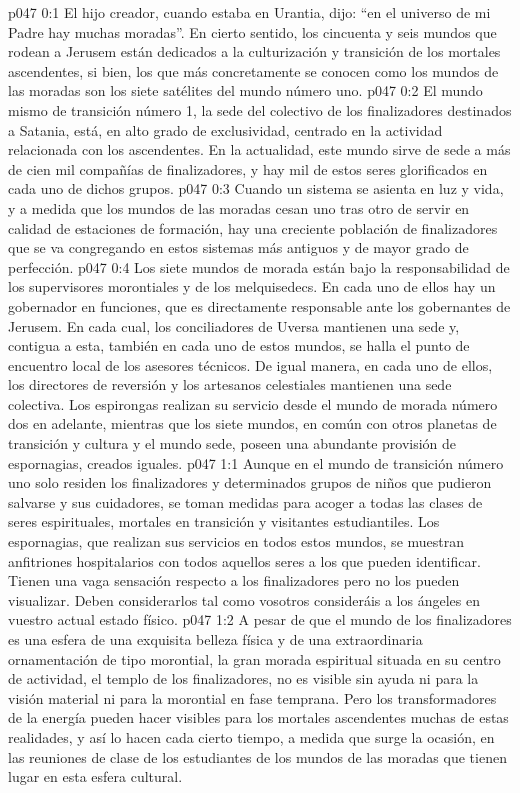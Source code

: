 \author{Brillante estrella vespertina}
\vs p047 0:1 El hijo creador, cuando estaba en Urantia, dijo: “en el universo de mi Padre hay muchas moradas”. En cierto sentido, los cincuenta y seis mundos que rodean a Jerusem están dedicados a la culturización y transición de los mortales ascendentes, si bien, los que más concretamente se conocen como los mundos de las moradas son los siete satélites del mundo número uno.
\vs p047 0:2 El mundo mismo de transición número 1, la sede del colectivo de los finalizadores destinados a Satania, está, en alto grado de exclusividad, centrado en la actividad relacionada con los ascendentes. En la actualidad, este mundo sirve de sede a más de cien mil compañías de finalizadores, y hay mil de estos seres glorificados en cada uno de dichos grupos.
\vs p047 0:3 Cuando un sistema se asienta en luz y vida, y a medida que los mundos de las moradas cesan uno tras otro de servir en calidad de estaciones de formación, hay una creciente población de finalizadores que se va congregando en estos sistemas más antiguos y de mayor grado de perfección.
\vs p047 0:4 Los siete mundos de morada están bajo la responsabilidad de los supervisores morontiales y de los melquisedecs. En cada uno de ellos hay un gobernador en funciones, que es directamente responsable ante los gobernantes de Jerusem. En cada cual, los conciliadores de Uversa mantienen una sede y, contigua a esta, también en cada uno de estos mundos, se halla el punto de encuentro local de los asesores técnicos. De igual manera, en cada uno de ellos, los directores de reversión y los artesanos celestiales mantienen una sede colectiva. Los espirongas realizan su servicio desde el mundo de morada número dos en adelante, mientras que los siete mundos, en común con otros planetas de transición y cultura y el mundo sede, poseen una abundante provisión de espornagias, creados iguales.
\vs p047 1:1 Aunque en el mundo de transición número uno solo residen los finalizadores y determinados grupos de niños que pudieron salvarse y sus cuidadores, se toman medidas para acoger a todas las clases de seres espirituales, mortales en transición y visitantes estudiantiles. Los espornagias, que realizan sus servicios en todos estos mundos, se muestran anfitriones hospitalarios con todos aquellos seres a los que pueden identificar. Tienen una vaga sensación respecto a los finalizadores pero no los pueden visualizar. Deben considerarlos tal como vosotros consideráis a los ángeles en vuestro actual estado físico.
\vs p047 1:2 A pesar de que el mundo de los finalizadores es una esfera de una exquisita belleza física y de una extraordinaria ornamentación de tipo morontial, la gran morada espiritual situada en su centro de actividad, el templo de los finalizadores, no es visible sin ayuda ni para la visión material ni para la morontial en fase temprana. Pero los transformadores de la energía pueden hacer visibles para los mortales ascendentes muchas de estas realidades, y así lo hacen cada cierto tiempo, a medida que surge la ocasión, en las reuniones de clase de los estudiantes de los mundos de las moradas que tienen lugar en esta esfera cultural.
